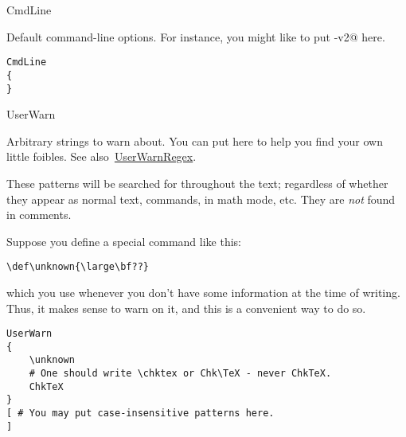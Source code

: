 \begin{chktexrclistvar}{CmdLine}

Default command-line options.  For instance, you might like to put
\verb@-v2@ here.

\chktexrcdefault\begin{verbatim}
CmdLine
{
}
\end{verbatim}
\end{chktexrclistvar}


\begin{chktexrclistvar*}{UserWarn}

Arbitrary strings to warn about.  You can put here to help you find
your own little foibles.  See also~\hyperref[rc:UserWarnRegex]{UserWarnRegex}.

These patterns will be searched for throughout the text; regardless
of whether they appear as normal text, commands, in math mode, etc.
They are \emph{not} found in comments.

Suppose you define a special command like this:
\begin{verbatim}
\def\unknown{\large\bf??}
\end{verbatim}
which you use whenever you don't have some information at the time
of writing.  Thus, it makes sense to warn on it, and this is a
convenient way to do so.

\chktexrcdefault\begin{verbatim}
UserWarn
{
    \unknown
    # One should write \chktex or Chk\TeX - never ChkTeX.
    ChkTeX
}
[ # You may put case-insensitive patterns here.
]
\end{verbatim}
\end{chktexrclistvar*}



